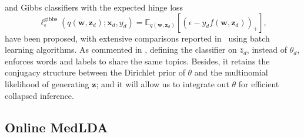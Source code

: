 \documentclass[twoside,11pt]{article}
\newcommand{\xv}{\bm{x}}
\newcommand{\zv}{\bm{z}}
\newcommand{\wv}{\bm{w}}
\begin{document}
and Gibbs classifiers with the expected hinge loss
\begin{equation}  \label{eq:batch_gibbs_loss}
\ell^\text{gibbs}_{\epsilon}(q(\wv, \zv_d); \xv_d, y_d) = \mathbb{E}_{q(\wv, \zv_d)}\left[ \left( \epsilon - y_d f(\bm{w}, \bm{z}_d) \right)_+ \right],
\end{equation}
have been proposed, with extensive comparisons reported in~\cite{zhugibbs2013} using batch learning algorithms. As commented in \citep{chang2010hierarchical}, defining the classifier on $\bar{z}_d$, instead of $\theta_d$, enforces words and labels to share the same topics. Besides, it retains the conjugacy structure between the Dirichlet prior of $\theta$ and the multinomial likelihood of generating $\bm{z}$; and it will allow us to integrate out $\theta$ for efficient collapsed inference.

\subsection{Online MedLDA} \label{sec:medlda}
\end{document}
